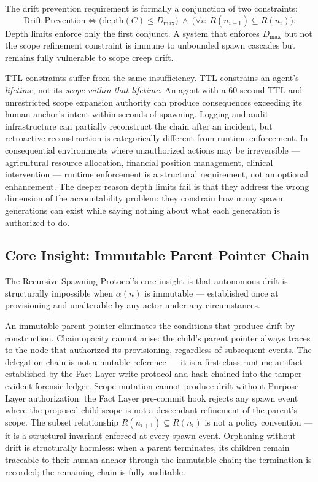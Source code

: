 The drift prevention requirement is formally a conjunction of two constraints:
\begin{equation}
\text{Drift Prevention} \iff \bigl(\text{depth}(C) \leq D_{\max}\bigr)\ \land\ \bigl(\forall i:\ R(n_{i+1}) \subseteq R(n_i)\bigr).
\label{eq:intro-drift-prevention}
\end{equation}
Depth limits enforce only the first conjunct. A system that enforces $D_{\max}$ but not the scope refinement constraint is immune to unbounded spawn cascades but remains fully vulnerable to scope creep drift.

TTL constraints suffer from the same insufficiency. TTL constrains an agent's \emph{lifetime}, not its \emph{scope within that lifetime}. An agent with a 60-second TTL and unrestricted scope expansion authority can produce consequences exceeding its human anchor's intent within seconds of spawning. Logging and audit infrastructure can partially reconstruct the chain after an incident, but retroactive reconstruction is categorically different from runtime enforcement. In consequential environments where unauthorized actions may be irreversible — agricultural resource allocation, financial position management, clinical intervention — runtime enforcement is a structural requirement, not an optional enhancement. The deeper reason depth limits fail is that they address the wrong dimension of the accountability problem: they constrain how many spawn generations can exist while saying nothing about what each generation is authorized to do.

\subsection{Core Insight: Immutable Parent Pointer Chain}

The Recursive Spawning Protocol's core insight is that autonomous drift is structurally impossible when $\alpha(n)$ is immutable — established once at provisioning and unalterable by any actor under any circumstances.

An immutable parent pointer eliminates the conditions that produce drift by construction. Chain opacity cannot arise: the child's parent pointer always traces to the node that authorized its provisioning, regardless of subsequent events. The delegation chain is not a mutable reference — it is a first-class runtime artifact established by the Fact Layer write protocol and hash-chained into the tamper-evident forensic ledger. Scope mutation cannot produce drift without Purpose Layer authorization: the Fact Layer pre-commit hook rejects any spawn event where the proposed child scope is not a descendant refinement of the parent's scope. The subset relationship $R(n_{i+1}) \subseteq R(n_i)$ is not a policy convention — it is a structural invariant enforced at every spawn event. Orphaning without drift is structurally harmless: when a parent terminates, its children remain traceable to their human anchor through the immutable chain; the termination is recorded; the remaining chain is fully auditable.

